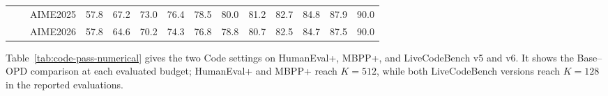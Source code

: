 \documentclass{article}
\theoremstyle{opdplain}
\begin{document}
\begin{table}[!ht]
\begin{tabular}{@{}S{75.0pt}|S{35.9pt}S{56.9pt}*{8}{N{12.7pt}}*{3}{N{16.4pt}}@{}}
 &  & AIME2025 & 57.8 & 67.2 & 73.0 & 76.4 & 78.5 & 80.0 & 81.2 & 82.7 & 84.8 & 87.9 & 90.0 \\
 &  & AIME2026 & 57.8 & 64.6 & 70.2 & 74.3 & 76.8 & 78.8 & 80.7 & 82.5 & 84.7 & 87.5 & 90.0 \\
\bottomrule[1.6pt]
\end{tabular}
\end{table}

Table~\ref{tab:code-pass-numerical} gives the two Code settings on HumanEval+, MBPP+, and LiveCodeBench v5 and v6. It shows the Base--OPD comparison at each evaluated budget; HumanEval+ and MBPP+ reach $K=512$, while both LiveCodeBench versions reach $K=128$ in the reported evaluations.
\end{document}

